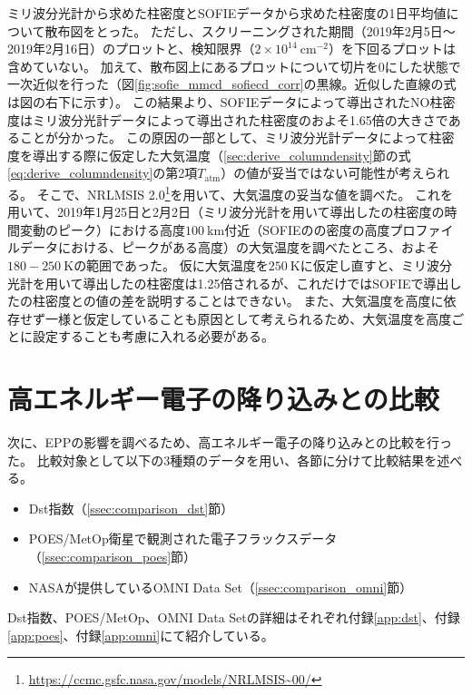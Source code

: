 ミリ波分光計から求めた柱密度とSOFIEデータから求めた柱密度の1日平均値について散布図をとった。
ただし、スクリーニングされた期間（2019年2月5日〜2019年2月16日）のプロットと、検知限界（$2\times 10^{14}\ \mathrm{cm^{-2}}$）を下回るプロットは含めていない。
加えて、散布図上にあるプロットについて切片を0にした状態で一次近似を行った（図\ref{fig:sofie_mmcd_sofiecd_corr}の黒線。近似した直線の式は図の右下に示す）。
この結果より、SOFIEデータによって導出されたNO柱密度はミリ波分光計データによって導出された柱密度のおよそ1.65倍の大きさであることが分かった。
この原因の一部として、ミリ波分光計データによって柱密度を導出する際に仮定した大気温度（\ref{sec:derive_columndensity}節の式\eqref{eq:derive_columndensity}の第2項$T_{\mathrm{atm}}$）の値が妥当ではない可能性が考えられる。
そこで、NRLMSIS 2.0\footnote{\url{https://ccmc.gsfc.nasa.gov/models/NRLMSIS~00/}}を用いて、大気温度の妥当な値を調べた。
これを用いて、2019年1月25日と2月2日（ミリ波分光計を用いて導出したの柱密度の時間変動のピーク）における高度$100\ \mathrm{km}$付近（SOFIEのの密度の高度プロファイルデータにおける、ピークがある高度）の大気温度を調べたところ、およそ$180-250\ \mathrm{K}$の範囲であった。
仮に大気温度を$250\ \mathrm{K}$に仮定し直すと、ミリ波分光計を用いて導出したの柱密度は1.25倍されるが、これだけではSOFIEで導出したの柱密度との値の差を説明することはできない。
また、大気温度を高度に依存せず一様と仮定していることも原因として考えられるため、大気温度を高度ごとに設定することも考慮に入れる必要がある。


\section{高エネルギー電子の降り込みとの比較}
\label{sec:comparison_eep}
次に、EPPの影響を調べるため、高エネルギー電子の降り込みとの比較を行った。
比較対象として以下の3種類のデータを用い、各節に分けて比較結果を述べる。
\begin{itemize}
    \item Dst指数（\ref{ssec:comparison_dst}節）
    \item POES/MetOp衛星で観測された電子フラックスデータ（\ref{ssec:comparison_poes}節）
    \item NASAが提供しているOMNI Data Set（\ref{ssec:comparison_omni}節）
\end{itemize} \par
Dst指数、POES/MetOp、OMNI Data Setの詳細はそれぞれ付録\ref{app:dst}、付録\ref{app:poes}、付録\ref{app:omni}にて紹介している。


